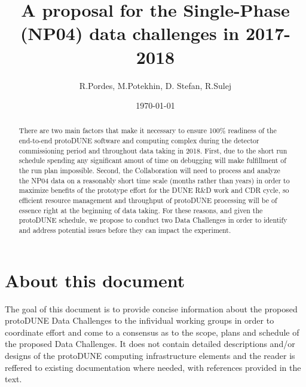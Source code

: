 \documentclass[pdftex,12pt,letter]{article}
\title{A proposal for the Single-Phase \pd (NP04) data challenges in 2017-2018}
\date{\today}
\author{R.Pordes, M.Potekhin, D. Stefan, R.Sulej}
\newcommand{\pd}{protoDUNE\xspace}
\begin{document}

\maketitle

\begin{abstract}
\noindent There are two main factors that make it necessary to ensure 100\% readiness of the
end-to-end \pd software and computing complex during the detector commissioning period and
throughout data taking in 2018. First, due to the short run schedule spending any significant amout
of time on debugging will make fulfillment of
the run plan impossible. Second, the Collaboration will need to process and analyze the NP04 data
on a reasonably short time scale (months rather than years) in order to maximize benefits of the
prototype effort for the DUNE R\&D work and CDR cycle, so efficient resource management and
throughput of \pd processing will be of essence right at the beginning of data taking. For these
reasons, and given the \pd schedule,  we propose to conduct two Data Challenges in order to identify
and address potential issues before they can impact the experiment.



\end{abstract}

\tableofcontents

\pagebreak

\section{About this document}
The goal of this document is to provide concise information about the proposed \pd Data Challenges
to the infividual working groups in order to coordinate effort and come to a consensus as to the scope,
plans and schedule of the proposed Data Challenges. It does not contain detailed descriptions
and/or designs of the \pd computing
infrastructure elements and the reader is reffered to existing documentation where
needed, with references provided in the text.
\end{document}
